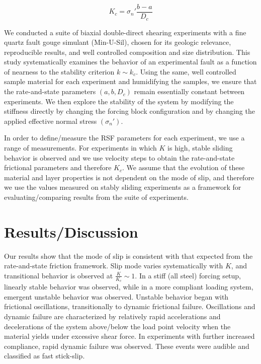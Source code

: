 \documentclass[11pt]{article}
\begin{document}
\begin{equation}
    K_c = \sigma_n' \frac{b-a}{D_c}
    \label{equation:kc}
\end{equation}

We conducted a suite of biaxial double-direct shearing experiments with a fine
quartz fault gouge simulant (Min-U-Sil\textsuperscript{\textregistered}), chosen
for its geologic relevance, reproducible results, and well controlled
composition and size distribution. This study systematically examines the
behavior of an experimental fault as a function of nearness to the stability
criterion $k \sim k_c$. Using the same, well  controlled sample material for
each experiment and humidifying the samples, we ensure that the rate-and-state
parameters $(a,b,D_c)$ remain essentially constant between experiments. We then explore the stability
of the system by modifying the stiffness directly by changing the forcing block
configuration and by changing the applied effective normal stress $(\sigma_n')$.

In order to define/measure the RSF parameters for each experiment, we use a
range of measurements. For experiments in which $K$ is high, stable sliding
behavior is  observed and we use velocity steps to obtain the rate-and-state
frictional parameters and therefore $K_c$.  We assume that the evolution of
these material and layer properties is not dependent on the mode of slip, and
therefore we use the values measured on stably sliding experiments as a
framework for evaluating/comparing results from the suite of experiments.


\section{Results/Discussion}

Our results show that the mode of slip is consistent with that expected from the
rate-and-state friction framework. Slip mode varies systematically with $K$,
and transitional behavior is observed at $\frac{K}{K_c} \sim 1$. In a stiff (all
steel) forcing setup, linearly stable behavior was observed, while in a
more compliant loading system, emergent unstable behavior was observed. Unstable
behavior began with frictional oscillations, transitionally to dynamic frictional
failure. Oscillations and dynamic failure are characterized by relatively rapid
accelerations and decelerations of the system above/below the load point
velocity when the material yields under excessive shear force. In experiments with
further increased compliance, rapid dynamic failure was observed. These events
were audible and classified as fast stick-slip.
\end{document}
